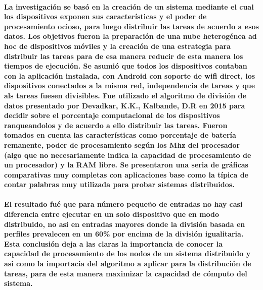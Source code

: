 \paragraph{
    La investigación se basó en la creación de un sistema mediante el cual los dispositivos exponen sus características y el poder de procesamiento ocioso, para luego distribuir las tareas de acuerdo a esos datos.
    Los objetivos fueron la preparación de una nube heterogénea ad hoc de dispositivos móviles y la creación de una estrategia para distribuir las tareas para de esa manera reducir de esta manera los tiempos de ejecución.
    Se asumió que todos los dispositivos contaban con la aplicación instalada, con Android con soporte de wifi direct, los dispositivos conectados a la misma red, independencia de tareas y que als tareas fuesen divisibles. Fue utilizado el algoritmo de división de datos presentado por Devadkar, K.K., Kalbande, D.R en 2015 para decidir sobre el porcentaje computacional de los dispositivos ranqueandolos y de acuerdo a ello distribuir las tareas. Fueron tomados en cuenta las características como porcentaje de batería remanente, poder de procesamiento según los Mhz del procesador (algo que no necesariamente indica la capacidad de procesamiento de un procesador) y la RAM libre. Se presentaron una seria de gráficas comparativas muy completas con aplicaciones base como la típica de contar palabras muy utilizada para probar sistemas distribuidos.
}

\paragraph{
    El resultado fué que para número pequeño de entradas no hay casi diferencia entre ejecutar en un solo dispositivo que en modo distribuido, no asi en entradas mayores donde la división basada en perfiles prevalecen en un 60\% por encima de la división igualitaria.
    Esta conclusión deja a las claras la importancia de conocer la capacidad de procesamiento de los nodos de un sistema distribuido y asi como la importacia del algoritmo a aplicar para la distribución de tareas, para de esta manera maximizar la capacidad de cómputo del sistema.
}

